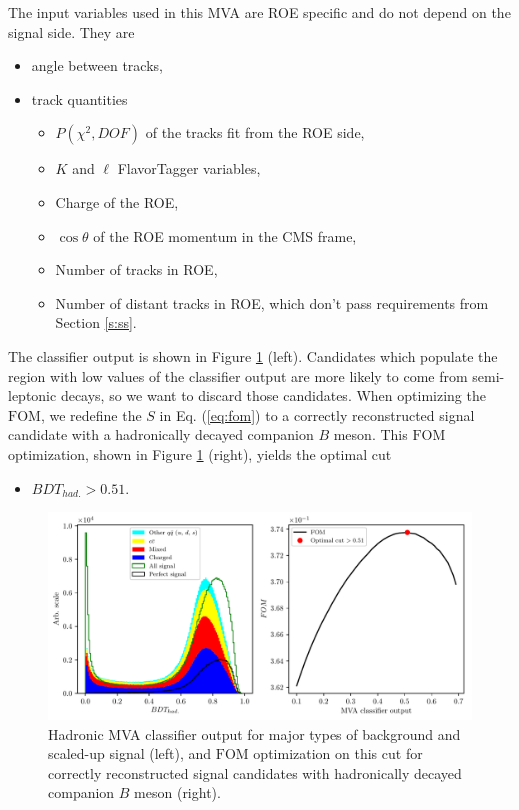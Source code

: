 The input variables used in this MVA are ROE specific and do not depend on the signal side. They are
\begin{itemize}
\item angle between tracks,
\item track quantities
	\begin{itemize}
	\item $P(\chi^2,DOF)$ of the tracks fit from the ROE side,
	\item $K$ and $\ell$ FlavorTagger variables,
	\item Charge of the ROE,
	\item $\cos \theta$ of the ROE momentum in the CMS frame,
	\item Number of tracks in ROE,
	\item Number of distant tracks in ROE, which don't pass requirements from Section \ref{s:ss}.
	\end{itemize}
\end{itemize}
%
The classifier output is shown in Figure \ref{fig:hdmva} (left). Candidates which populate the region with low values of the classifier output are more likely to come from semi-leptonic decays, so we want to discard those candidates. When optimizing the $\mathrm{FOM}$, we redefine the $S$ in Eq. (\ref{eq:fom}) to a correctly reconstructed signal candidate with a hadronically decayed companion $B$ meson. This $\mathrm{FOM}$ optimization, shown in Figure \ref{fig:hdmva} (right), yields the optimal cut
\begin{itemize}
\item $BDT_{had.} > 0.51.$
\end{itemize} 

\begin{figure}[H]
\centering
\captionsetup{width=0.8\linewidth}
\includegraphics[width=\linewidth]{fig/hdmva_opt}
\caption{Hadronic MVA classifier output for major types of background and scaled-up signal (left), and $\mathrm{FOM}$ optimization on this cut for correctly reconstructed signal candidates with hadronically decayed companion $B$ meson (right).}
\label{fig:hdmva}
\end{figure}

